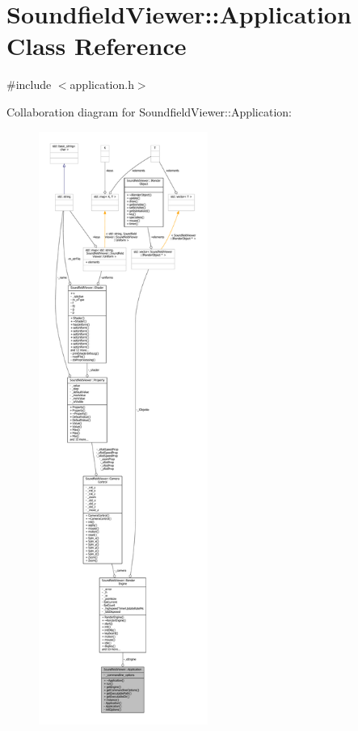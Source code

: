 \section{Soundfield\-Viewer\-:\-:Application Class Reference}
\label{classSoundfieldViewer_1_1Application}


{\ttfamily \#include $<$application.\-h$>$}



Collaboration diagram for Soundfield\-Viewer\-:\-:Application\-:
\nopagebreak
\begin{figure}[H]
\begin{center}
\leavevmode
\includegraphics[height=550pt]{d2/de8/classSoundfieldViewer_1_1Application__coll__graph}
\end{center}
\end{figure}
